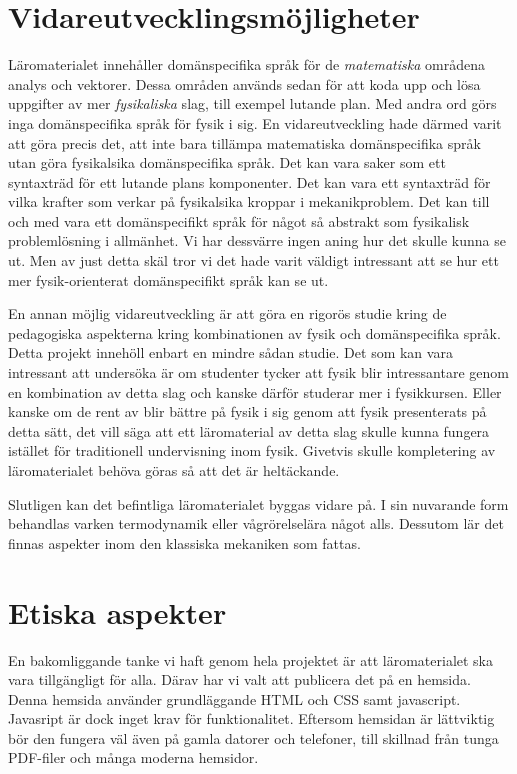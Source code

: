 \begin{binge}
\section{Vidareutvecklingsmöjligheter}

Läromaterialet innehåller domänspecifika språk för de \textit{matematiska} områdena analys och vektorer. Dessa områden används sedan för att koda upp och lösa uppgifter av mer \textit{fysikaliska} slag, till exempel lutande plan. Med andra ord görs inga domänspecifika språk för fysik i sig. En vidareutveckling hade därmed varit att göra precis det, att inte bara tillämpa matematiska domänspecifika språk utan göra fysikalsika domänspecifika språk. Det kan vara saker som ett syntaxträd för ett lutande plans komponenter. Det kan vara ett syntaxträd för vilka krafter som verkar på fysikalsika kroppar i mekanikproblem. Det kan till och med vara ett domänspecifikt språk för något så abstrakt som fysikalisk problemlösning i allmänhet. Vi har dessvärre ingen aning hur det skulle kunna se ut. Men av just detta skäl tror vi det hade varit väldigt intressant att se hur ett mer fysik-orienterat domänspecifikt språk kan se ut.

En annan möjlig vidareutveckling är att göra en rigorös studie kring de pedagogiska aspekterna kring kombinationen av fysik och domänspecifika språk. Detta projekt innehöll enbart en mindre sådan studie. Det som kan vara intressant att undersöka är om studenter tycker att fysik blir intressantare genom en kombination av detta slag och kanske därför studerar mer i fysikkursen. Eller kanske om de rent av blir bättre på fysik i sig genom att fysik presenterats på detta sätt, det vill säga att ett läromaterial av detta slag skulle kunna fungera istället för traditionell undervisning inom fysik. Givetvis skulle kompletering av läromaterialet behöva göras så att det är heltäckande.

Slutligen kan det befintliga läromaterialet byggas vidare på. I sin nuvarande form behandlas varken termodynamik eller vågrörelselära något alls. Dessutom lär det finnas aspekter inom den klassiska mekaniken som fattas.

\section{Etiska aspekter}

En bakomliggande tanke vi haft genom hela projektet är att läromaterialet ska vara tillgängligt för alla. Därav har vi valt att publicera det på en hemsida. Denna hemsida använder grundläggande HTML och CSS samt javascript. Javasript är dock inget krav för funktionalitet. Eftersom hemsidan är lättviktig bör den fungera väl även på gamla datorer och telefoner, till skillnad från tunga PDF-filer och många moderna hemsidor.


\end{binge}
